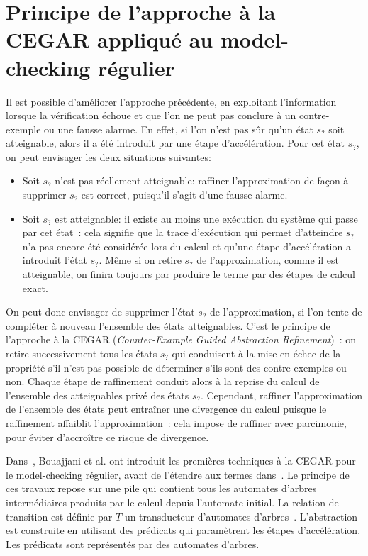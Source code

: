 \section{Principe de l'approche à la {CEGAR} appliqué au model-checking régulier}

Il est possible d'améliorer l'approche précédente, en exploitant l'information
lorsque la vérification échoue et que l'on ne peut pas conclure à un contre-exemple ou une fausse alarme.
En effet, si l'on n'est pas sûr qu'un état $s_?$ soit atteignable, alors il a été introduit par une étape d'accélération.
Pour cet état $s_?$, on peut envisager les deux situations suivantes:

\begin{itemize}
\item
  Soit $s_?$ n'est pas réellement atteignable: raffiner l'approximation de façon
  à supprimer $s_?$ est correct, puisqu'il s'agit d'une fausse alarme.
\item
  Soit $s_?$ est atteignable: il existe au moins une exécution du système qui passe par cet état~:
  cela signifie que la trace d'exécution qui permet d'atteindre $s_?$ n'a pas encore été considérée
  lors du calcul et qu'une étape d'accélération a introduit l'état $s_?$.
  Même si on retire $s_?$ de l'approximation, comme il est atteignable, on finira toujours
  par produire le terme par des étapes de calcul exact. 
\end{itemize}
On peut donc envisager de supprimer l'état $s_?$ de l'approximation, si l'on tente de compléter à nouveau
l'ensemble des états atteignables. C'est le principe de l'approche à la {CEGAR}
(\emph{Counter-Example Guided Abstraction Refinement})~\cite{DBLP:conf/time/Clarke03}: on retire successivement tous les
états $s_?$ qui conduisent à la mise en échec de la propriété s'il n'est pas possible
de déterminer s'ils sont des contre-exemples ou non. Chaque étape de raffinement conduit 
alors à la reprise du calcul de l'ensemble des atteignables privé des états $s_?$.
Cependant, raffiner l'approximation de l'ensemble des états peut entraîner une divergence du calcul
puisque le raffinement affaiblit l'approximation~: cela impose de raffiner avec parcimonie, pour
éviter d'accroître ce risque de divergence.


Dans~\cite{DBLP:conf/cav/BouajjaniHV04}, Bouajjani et al. ont introduit les premières
techniques à la CEGAR pour le model-checking régulier, avant de
l'étendre aux termes dans~\cite{BouajjaniHRV-Infinity06,BouajjaniHRV-SAS06}. 
Le principe de ces travaux repose sur une pile qui contient tous les automates d'arbres
intermédiaires produits par le calcul depuis l'automate initial.
La relation de transition est définie par $T$ un transducteur d'automates
d'arbres~\cite{TATA}. L'abstraction est construite en utilisant des prédicats 
qui paramètrent les étapes d'accélération.
Les prédicats sont représentés par des automates d'arbres.

